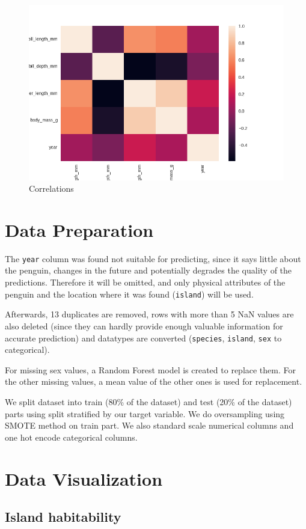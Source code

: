 \documentclass[12pt,a4paper]{article}
\begin{document}
\begin{figure}[h]
	\centering
	\includegraphics[width=0.7\linewidth]{fig_correlation}
	\caption{Correlations}
	\label{fig:figcorrelation}
\end{figure}

\section{Data Preparation}

The \texttt{year} column was found not suitable for predicting, since it says little about the penguin, changes in the future and potentially degrades the quality of the predictions. Therefore it will be omitted, and only physical attributes of the penguin and the location where it was found (\texttt{island}) will be used.

Afterwards, 13 duplicates are removed, rows with more than 5 NaN values are also deleted (since they can hardly provide enough valuable information for accurate prediction) and datatypes are converted (\texttt{species}, \texttt{island}, \texttt{sex} to categorical).

For missing sex values, a Random Forest model is created to replace them. For the other missing values, a mean value of the other ones is used for replacement.

We split dataset into train (80\% of the dataset) and test (20\% of the dataset) parts using split stratified by our target variable.
We do oversampling using SMOTE method on train part.
We also standard scale numerical columns and one hot encode categorical columns.

\section{Data Visualization}

\subsection{Island habitability}
\end{document}
